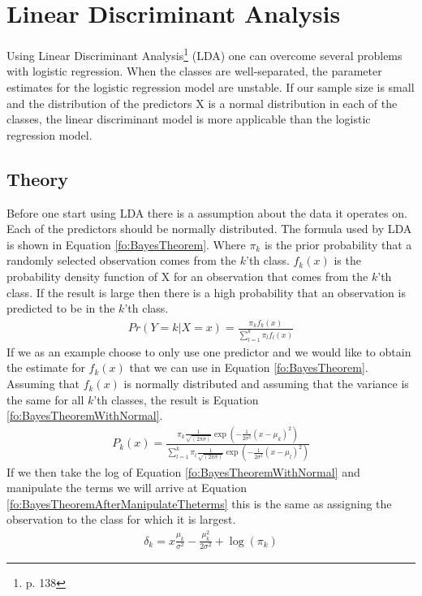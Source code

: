 \section{Linear Discriminant Analysis}
Using Linear Discriminant Analysis\footnote{\cite{James2013} p. 138} (LDA) one can overcome several problems with logistic regression. When the classes are well-separated, the parameter estimates for the logistic regression model are unstable. If our sample size is small and the distribution of the predictors X is a normal distribution in each of the classes, the linear discriminant model is more applicable than the logistic regression model.
\subsection{Theory}
Before one start using LDA there is a  assumption about the data it operates on. Each of the predictors should be normally distributed. The formula used by LDA is shown in Equation \ref{fo:BayesTheorem}. Where $\pi_k$ is the prior probability that a randomly selected observation comes from the $k$'th class. $f_k(x)$ is the probability density function of X for an observation that comes from the $k$'th class. If the result is large then there is a high probability that an observation is predicted to be in the $k$'th class.
\begin{align}\label{fo:BayesTheorem}
Pr(Y=k|X=x) = \frac{\pi_k f_k(x)}{ \sum_{l=1}^{k}\pi_l f_l(x) }
\end{align}
If we as an example choose to only use one predictor and we would like to obtain the estimate for $f_k(x)$ that we can use in Equation \ref{fo:BayesTheorem}. Assuming that $f_k(x)$ is normally distributed and assuming that the variance is the same for all $k$'th classes, the result is Equation \ref{fo:BayesTheoremWithNormal}.
\begin{align}\label{fo:BayesTheoremWithNormal}
P_k(x) = \frac{\pi_k \frac{1}{\sqrt{(2\pi\sigma)}}\exp(-\frac{1}{2\sigma^2}(x-\mu_k)^2)}{\sum_{l=1}^{k}\pi_l \frac{1}{\sqrt{(2\pi\sigma)}}\exp(-\frac{1}{2\sigma^2}(x-\mu_l)^2) }
\end{align}
If we then take the log of Equation \ref{fo:BayesTheoremWithNormal} and manipulate the terms we will arrive at Equation \ref{fo:BayesTheoremAfterManipulateTheterms} this is the same as assigning the observation to the class for which it is largest.
\begin{align}\label{fo:BayesTheoremAfterManipulateTheterms}
\delta_k = x\frac{\mu_k}{\sigma^2} - \frac{\mu^2_k}{2 \sigma^2} + \log(\pi_k)
\end{align}
